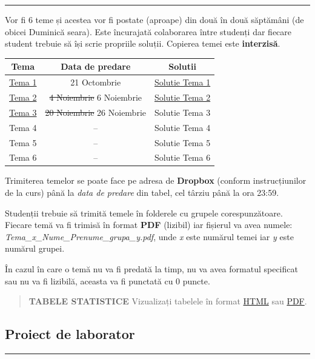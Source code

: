 \documentclass[]{article}
\begin{document}
\begin{center}\rule{0.5\linewidth}{\linethickness}\end{center}

Vor fi 6 teme și acestea vor fi postate (aproape) din două în două
săptămâni (de obicei Duminică seara). Este încurajată colaborarea între
studenți dar fiecare student trebuie să își scrie propriile soluții.
Copierea temei este \textbf{interzisă}.

\begin{longtable}[]{@{}ccc@{}}
\toprule
Tema & Data de predare & Solutii\tabularnewline
\midrule
\endhead
\href{homework/Tema1.pdf}{Tema 1} & 21 Octombrie &
\href{homework/Tema1_Sol.pdf}{Solutie Tema 1}\tabularnewline
\href{homework/Tema2.pdf}{Tema 2} & \sout{4 Noiembrie} 6 Noiembrie &
\href{homework/Tema2_Sol.pdf}{Solutie Tema 2}\tabularnewline
\href{homework/Tema3.pdf}{Tema 3} & \sout{20 Noiembrie} 26 Noiembrie &
Solutie Tema 3\tabularnewline
Tema 4 & -- & Solutie Tema 4\tabularnewline
Tema 5 & -- & Solutie Tema 5\tabularnewline
Tema 6 & -- & Solutie Tema 6\tabularnewline
\bottomrule
\end{longtable}

Trimiterea temelor se poate face pe adresa de \textbf{Dropbox} (conform
instrucțiunilor de la curs) până la \emph{data de predare} din tabel,
cel târziu până la ora 23:59.

Studenții trebuie să trimită temele în folderele cu grupele
corespunzătoare. Fiecare temă va fi trimisă în format \textbf{PDF}
(lizibil) iar fișierul va avea numele:
\emph{Tema\_x\_Nume\_Prenume\_grupa\_y.pdf}, unde \emph{x} este numărul
temei iar \emph{y} este numărul grupei.

\begin{rmdcaution}
În cazul în care o temă nu va fi predată la timp, nu va avea formatul
specificat sau nu va fi lizibilă, aceasta va fi punctată cu 0 puncte.
\end{rmdcaution}

\begin{quote}
\textbf{TABELE STATISTICE} Vizualizați tabelele în format
\href{tables/Tabele_Statistice.html}{HTML} sau
\href{tables/Tabele_Statistice_v2.pdf}{PDF}.
\end{quote}

\subsection{Proiect de laborator}\label{proiect-de-laborator}

\begin{center}\rule{0.5\linewidth}{\linethickness}\end{center}
\end{document}
